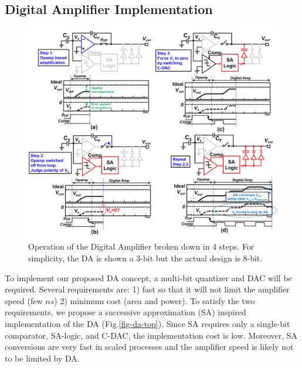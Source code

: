 
\subsection{Digital Amplifier Implementation}

\begin{figure}[!]
\centering
  \includegraphics[width=1\textwidth]{figure/chap2/da-operation.jpg}
  \caption{Operation of the Digital Amplifier broken down in 4 steps. For simplicity, the DA is shown a 3-bit but the actual design is 8-bit.}
  \label{fig-da-operation}
\end{figure}

To implement our proposed DA concept, a multi-bit quantizer and DAC will be required. Several requirements are: 1) fast so that it will not limit the amplifier speed (few $ns$) 2) minimum cost (area and power).
To satisfy the two requirements, we propose a successive approximation (SA) inspired implementation of the DA (Fig.\ref{fig-da-top}). Since SA requires only a single-bit comparator, SA-logic, and C-DAC, the implementation cost is low. Moreover, SA conversions are very fast in scaled processes \cite{kullsar} and the amplifier speed is likely not to be limited by DA.  

